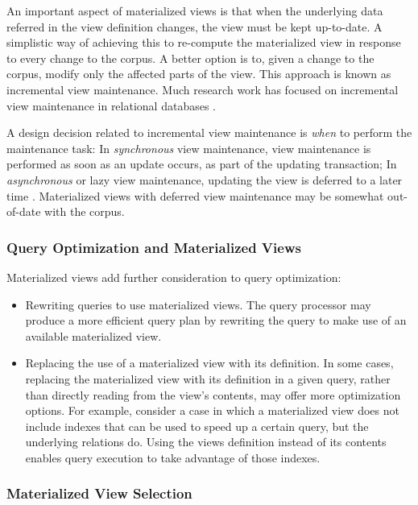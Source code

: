 An important aspect of materialized views is that when the underlying data referred in the view definition changes,
the view must be kept up-to-date.
A simplistic way of achieving this to re-compute the materialized view in response to every change to the corpus.
A better option is to, given a change to the corpus, modify only the affected parts of the view.
This approach is known as incremental view maintenance.
Much research work has focused on incremental view maintenance in relational databases
\cite{larson:outerjoinviewmaintenance, lee:multiplejoinviewmaintenance, zhuge:viewmaintenance}.

A design decision related to incremental view maintenance is \textit{when} to perform the maintenance task:
In \textit{synchronous} view maintenance, view maintenance is performed as soon as an update occurs,
as part of the updating transaction;
In \textit{asynchronous} or lazy view maintenance,
updating the view is deferred to a later time \cite{zhou:lazymvMaintenance}.
Materialized views with deferred view maintenance may be somewhat out-of-date with the corpus.

\subsubsection{Query Optimization and Materialized Views}

Materialized views add further consideration to query optimization:

\begin{itemize}

  \item Rewriting queries to use materialized views.
  The query processor may produce a more efficient query plan by rewriting the query to make use of an available
  materialized view.

  \item Replacing the use of a materialized view with its definition.
  In some cases, replacing the materialized view with its definition in a given query, rather than directly reading from the view's contents,
  may offer more optimization options.
  For example, consider a case in which a materialized view does not include indexes that can be used to speed up a certain query,
  but the underlying relations do.
  Using the views definition instead of its contents enables query execution to take advantage of those indexes.

\end{itemize}

\subsubsection{Materialized View Selection}

